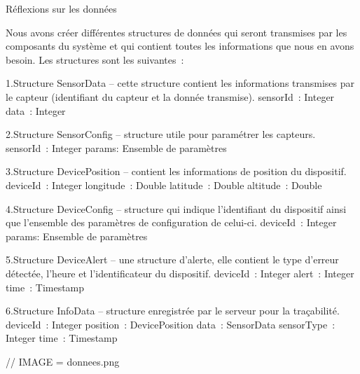 Réflexions sur les données

Nous avons créer différentes structures de données qui seront transmises par les composants du système et qui contient toutes les informations que nous en avons besoin.
Les structures sont les suivantes :

1.Structure SensorData – cette structure contient les informations transmises par le capteur (identifiant du capteur et la donnée transmise).
sensorId : Integer
data : Integer

2.Structure SensorConfig –  structure utile pour paramétrer les capteurs.
sensorId : Integer
params: Ensemble de paramètres

3.Structure DevicePosition – contient les informations de position du dispositif.
deviceId : Integer
longitude : Double
latitude : Double
altitude : Double

4.Structure DeviceConfig –  structure qui indique l’identifiant du dispositif ainsi que l’ensemble des paramètres de configuration de celui-ci.
deviceId : Integer
params: Ensemble de paramètres

5.Structure DeviceAlert – une structure d'alerte, elle contient le type d'erreur détectée, l'heure et l'identificateur du dispositif.
deviceId : Integer
alert : Integer
time : Timestamp

6.Structure InfoData – structure enregistrée par le serveur pour la traçabilité.
deviceId : Integer
position : DevicePosition
data : SensorData
sensorType : Integer
time : Timestamp

// IMAGE = donnees.png
